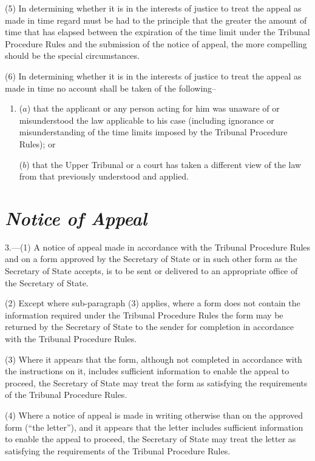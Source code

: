 \documentclass[12pt,a4paper]{article}
\begin{document}
(5) In determining whether it is in the interests of justice to treat the appeal as made in time regard must be had to the principle that the greater the amount of time that has elapsed between the expiration of the time limit under the Tribunal Procedure Rules and the submission of the notice of appeal, the more compelling should be the special circumstances.

(6) In determining whether it is in the interests of justice to treat the appeal as made in time no account shall be taken of the following–
\begin{enumerate}\item[]
($a$) that the applicant or any person acting for him was unaware of or misunderstood the law applicable to his case (including ignorance or misunderstanding of the time limits imposed by the Tribunal Procedure Rules); or

($b$) that the Upper Tribunal or a court has taken a different view of the law from that previously understood and applied.
\end{enumerate}

\section*{\itshape Notice of Appeal}

3.---(1)  A notice of appeal made in accordance with the Tribunal Procedure Rules and on a form approved by the Secretary of State or in such other form as the Secretary of State accepts, is to be sent or delivered to an appropriate office of the Secretary of State.

(2) Except where sub-paragraph (3) applies, where a form does not contain the information required under the Tribunal Procedure Rules the form may be returned by the Secretary of State to the sender for completion in accordance with the Tribunal Procedure Rules.

(3) Where it appears that the form, although not completed in accordance with the instructions on it, includes sufficient information to enable the appeal to proceed, the Secretary of State may treat the form as satisfying the requirements of the Tribunal Procedure Rules.

(4) Where a notice of appeal is made in writing otherwise than on the approved form (“the letter”), and it appears that the letter includes sufficient information to enable the appeal to proceed, the Secretary of State may treat the letter as satisfying the requirements of the Tribunal Procedure Rules.
\end{document}
